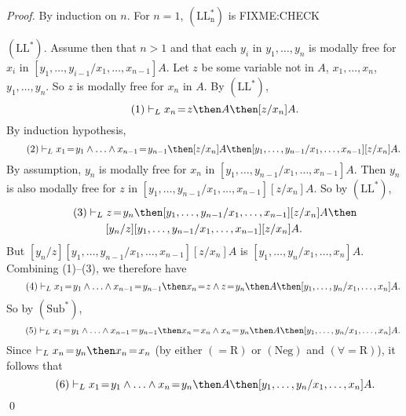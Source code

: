 \documentclass[11pt]{woarticle}
\theoremstyle{break}
\theoremstyle{nonumberplain}
\newcommand{\1}{\;\,|\;\,}
\newcommand{\T}[1]{\ensuremath{(\mathrm{ #1})}}
\begin{document}
\begin{proof} By induction on $n$. For $n=1$, \T{LL^*_n} is
  FIXME:CHECK
  
  \T{LL^*}. Assume then that $n > 1$ and that each $y_i$ in
  $y_1,\ldots,y_n$ is modally free for $x_i$ in
  $[y_1,\ldots,y_{i-1}/x_1,\ldots,x_{n-1}]A$. Let $z$ be some variable
  not in $A$, $x_1,\ldots,x_n$, $y_1,\ldots,y_n$. So $z$ is modally
  free for $x_n$ in $A$. By \T{LL^*},
  \begin{equation}\tag{1}
    \vdash_L x_n\!=\!z \then A \then [z/x_n]A.
  \end{equation}
  By induction hypothesis,
  \begin{equation}\tag{2}
    \vdash_L x_1\!=\!y_1 \land \ldots
    \land x_{n-1}\!=\!y_{n-1} \then [z/x_n]A \then [y_1,\ldots,y_{n-1} /
    x_1,\ldots,x_{n-1}][z/x_n]A.
  \end{equation}
  By assumption, $y_n$ is modally free for $x_n$ in
  $[y_1,\ldots,y_{n-1}/x_1,\ldots,x_{n-1}]A$. Then $y_n$ is also
  modally free for $z$ in $[y_1,\ldots,y_{n-1} /
  x_1,\ldots,x_{n-1}][z/x_n]A$. So by \T{LL^*},
  \begin{multline}\tag{3}
    \vdash_L z\!=\!y_n \then [y_1,\ldots,y_{n-1} /
    x_1,\ldots,x_{n-1}][z/x_n]A \then \\
    [y_n/z][y_1,\ldots,y_{n-1} / x_1,\ldots,x_{n-1}][z/x_n]A.
  \end{multline}
  But $[y_n/z][y_1,\ldots,y_{n-1} / x_1,\ldots,x_{n-1}][z/x_n]A$ is
  $[y_1,\ldots,y_n/x_1,\ldots,x_n]A$. Combining (1)--(3), we therefore
  have
  \begin{equation}\tag{4}
    \vdash_L x_1\!=\!y_1 \land \ldots \land x_{n-1}\!=\!y_{n-1} 
    \then x_n\!=\!z \land z\!=\!y_n \then A \then [y_1,\ldots,y_n /
    x_1,\ldots,x_n]A.
  \end{equation}
  So by \T{Sub^*},
  \begin{equation}\tag{5}
    \vdash_L x_1\!=\!y_1 \land \ldots \land x_{n-1}\!=\!y_{n-1} 
    \then x_n\!=\!x_n \land x_n\!=\!y_n \then A \then [y_1,\ldots,y_n /
    x_1,\ldots,x_n]A.
  \end{equation}
  Since $\vdash_L x_n\!=\!y_n \then x_n\!=\!x_n$ (by either \T{=\!R} or
  \T{Neg} and \T{\forall\!=\!R}), it follows that
  \begin{equation}\tag{6}
    \vdash_L x_1\!=\!y_1 \land \ldots \land x_{n}\!=\!y_{n} 
    \then A \then [y_1,\ldots,y_n / x_1,\ldots,x_n]A.
  \end{equation}
  \qed
\end{proof}
\end{document}
